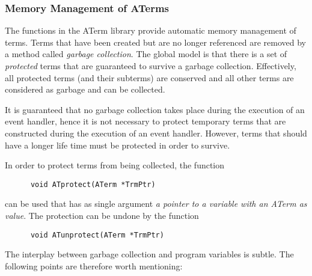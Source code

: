 \documentclass[twoside]{article} %
\begin{document}
\subsubsection{\label{Memory}Memory Management of ATerms}
The functions in the ATerm library provide automatic memory management
of terms.  Terms that have been created but are no longer referenced
are removed by a method called {\em garbage collection}.  The global
model is that there is a set of {\em protected} terms that are
guaranteed to survive a garbage collection.  Effectively, all
protected terms (and their subterms) are conserved and all other terms
are considered as garbage and can be collected.

It is guaranteed that no garbage collection takes place during
the execution of an event handler, hence it is not necessary to
protect temporary terms that are constructed during the execution
of an event handler.
However, terms that should have a longer life time must be protected
in order to survive.

In order to protect terms from being collected, the function
\begin{verbatim}
      void ATprotect(ATerm *TrmPtr)
\end{verbatim}
can be used that has as single argument {\em a pointer to a variable
with an ATerm  as value}. The protection can be undone
by the function
\begin{verbatim}
      void ATunprotect(ATerm *TrmPtr)
\end{verbatim}

The interplay between garbage collection and program variables
is subtle. The following points are therefore worth  mentioning:
\end{document}
